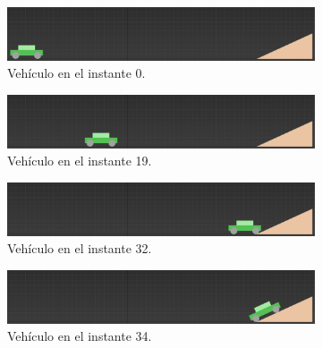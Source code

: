 \documentclass{article}
\begin{document}
\begin{figure}[H]
    \centering
    \begin{subfigure}[H]{0.48\textwidth}
        \centering
        \includegraphics[width=\textwidth]{imagenes/Ejercicio2/corregidas/keyframes/0.png}
        \caption{Vehículo en el instante 0.}
    \end{subfigure}
    \hfill
    \begin{subfigure}[H]{0.48\textwidth}
        \centering
        \includegraphics[width=\textwidth]{imagenes/Ejercicio2/corregidas/keyframes/19.png}
        \caption{Vehículo en el instante 19.}
    \end{subfigure}
    \par\bigskip
    \begin{subfigure}[H]{0.48\textwidth}
        \centering
        \includegraphics[width=\textwidth]{imagenes/Ejercicio2/corregidas/keyframes/32.png}
        \caption{Vehículo en el instante 32.}
    \end{subfigure}
    \hfill
    \begin{subfigure}[H]{0.48\textwidth}
        \centering
        \includegraphics[width=\textwidth]{imagenes/Ejercicio2/corregidas/keyframes/34.png}
        \caption{Vehículo en el instante 34.}
    \end{subfigure}
    \par\bigskip
    \begin{subfigure}[H]{0.48\textwidth}

\end{subfigure}
\end{figure}
\end{document}

